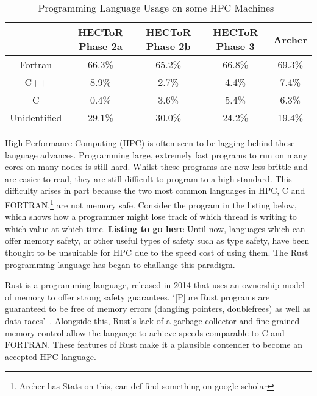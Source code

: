 \documentclass{article}[a4]
\begin{document}
\begin{table}
  \centering
  \caption{Programming Language Usage on some HPC Machines~\cite{Turner2015}}
  \label{tab:langs}
  \begin{tabular}{|c|c|c|c|c|}
    \hline
    & \textbf{HECToR Phase 2a} & \textbf{HECToR Phase 2b} & \textbf{HECToR Phase 3} & \textbf{Archer} \\
    \hline
    Fortran & 66.3\% & 65.2\% & 66.8\% & 69.3\% \\
    \hline
    C++ & 8.9\% & 2.7\% & 4.4\% & 7.4\% \\
    \hline
    C & 0.4\% & 3.6\% & 5.4\% & 6.3\% \\
    \hline
    Unidentified & 29.1\% &  30.0\% & 24.2\% & 19.4\% \\
    \hline
  \end{tabular}

\end{table}

High Performance Computing (HPC) is often seen to be lagging behind these language advances. Programming large, extremely fast programs to run on many cores on many nodes is still hard. Whilst these programs are now less brittle and are easier to read, they are still difficult to program to a high standard. This difficulty arises in part because the two most common languages in HPC, C and FORTRAN,\footnote{Archer has Stats on this, can def find something on google scholar} are not memory safe. Consider the program in the listing below, which shows how a programmer might lose track of which thread is writing to which value at which time.
\newline\newline
\indent\textbf{Listing to go here}
\newline\newline
Until now, languages which can offer memory safety, or other useful types of safety such as type safety, have been thought to be unsuitable for HPC due to the speed cost of using them. The Rust programming language has began to challange this paradigm.

Rust is a programming language, released in 2014 that uses an ownership model of memory to offer strong safety guarantees. `[P]ure Rust programs are guaranteed to be free of memory errors (dangling pointers, doublefrees) as well as data races'~\cite{Matsakis:2014}. Alongside this, Rust's lack of a garbage collector and fine grained memory control allow the language to achieve speeds comparable to C and FORTRAN. These features of Rust make it a plausible contender to become an accepted HPC language.
\end{document}
